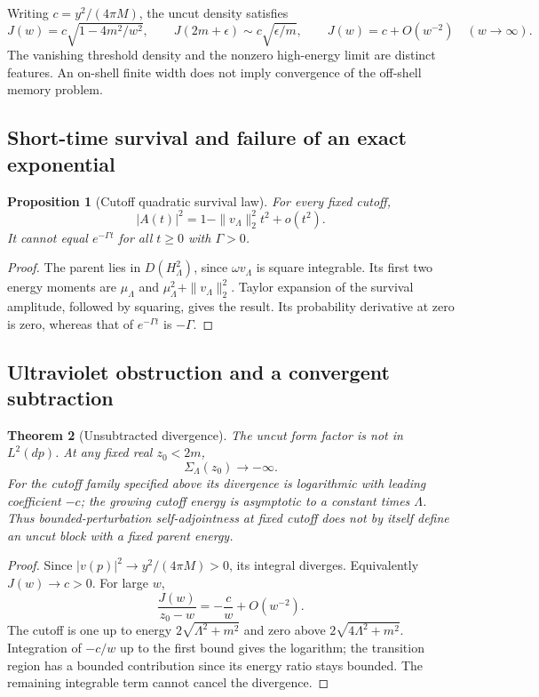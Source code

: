 \documentclass[11pt]{article}
\newtheorem{theorem}{Theorem}[section]
\newtheorem{proposition}[theorem]{Proposition}
\theoremstyle{remark}
\begin{document}
Writing \(c=y^2/(4\pi M)\), the uncut density satisfies
\[
 J(w)=c\sqrt{1-4m^2/w^2},\qquad
 J(2m+\epsilon)\sim c\sqrt{\epsilon/m},\qquad
 J(w)=c+O(w^{-2})\quad(w\to\infty).
\]
The vanishing threshold density and the nonzero high-energy limit
are distinct features.  An on-shell finite width does not imply
convergence of the off-shell memory problem.

\subsection{Short-time survival and failure of an exact exponential}

\begin{proposition}[Cutoff quadratic survival law]
\label{prop:v20v46-short}
For every fixed cutoff,
\[
 |A(t)|^2=1-\|v_\Lambda\|_2^2t^2+o(t^2).
\]
It cannot equal \(e^{-\Gamma t}\) for all \(t\geq0\) with
\(\Gamma>0\).
\end{proposition}
\begin{proof}
The parent lies in \(D(H_\Lambda^2)\), since \(\omega v_\Lambda\)
is square integrable.  Its first two energy moments are
\(\mu_\Lambda\) and \(\mu_\Lambda^2+\|v_\Lambda\|_2^2\).
Taylor expansion of the survival amplitude, followed by squaring,
gives the result.  Its probability derivative at zero is zero,
whereas that of \(e^{-\Gamma t}\) is \(-\Gamma\).
\end{proof}

\subsection{Ultraviolet obstruction and a convergent subtraction}

\begin{theorem}[Unsubtracted divergence]
\label{thm:v20v46-UV}
The uncut form factor is not in \(L^2(dp)\).  At any fixed real
\(z_0<2m\),
\[
 \Sigma_\Lambda(z_0)\longrightarrow-\infty .
\]
For the cutoff family specified above its divergence is logarithmic
with leading coefficient \(-c\); the growing cutoff energy is
asymptotic to a constant times \(\Lambda\).
Thus bounded-perturbation self-adjointness at fixed cutoff does not
by itself define an uncut block with a fixed parent energy.
\end{theorem}
\begin{proof}
Since \(|v(p)|^2\to y^2/(4\pi M)>0\), its integral diverges.
Equivalently \(J(w)\to c>0\).  For large \(w\),
\[
 \frac{J(w)}{z_0-w}=-\frac c w+O(w^{-2}).
\]
The cutoff is one up to energy \(2\sqrt{\Lambda^2+m^2}\) and
zero above \(2\sqrt{4\Lambda^2+m^2}\).  Integration of \(-c/w\)
up to the first bound gives the logarithm; the transition region
has a bounded contribution since its energy ratio stays bounded.
The remaining integrable term cannot cancel the divergence.
\end{proof}
\end{document}

